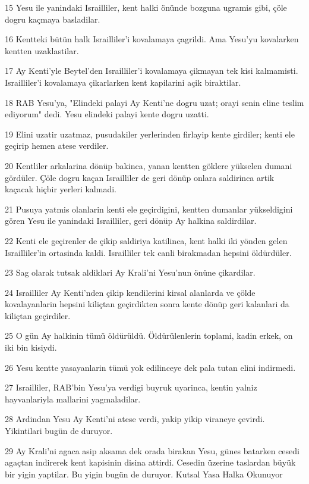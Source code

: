 \par 15 Yesu ile yanindaki Israilliler, kent halki önünde bozguna ugramis gibi, çöle dogru kaçmaya basladilar.
\par 16 Kentteki bütün halk Israilliler'i kovalamaya çagrildi. Ama Yesu'yu kovalarken kentten uzaklastilar.
\par 17 Ay Kenti'yle Beytel'den Israilliler'i kovalamaya çikmayan tek kisi kalmamisti. Israilliler'i kovalamaya çikarlarken kent kapilarini açik biraktilar.
\par 18 RAB Yesu'ya, "Elindeki palayi Ay Kenti'ne dogru uzat; orayi senin eline teslim ediyorum" dedi. Yesu elindeki palayi kente dogru uzatti.
\par 19 Elini uzatir uzatmaz, pusudakiler yerlerinden firlayip kente girdiler; kenti ele geçirip hemen atese verdiler.
\par 20 Kentliler arkalarina dönüp bakinca, yanan kentten göklere yükselen dumani gördüler. Çöle dogru kaçan Israilliler de geri dönüp onlara saldirinca artik kaçacak hiçbir yerleri kalmadi.
\par 21 Pusuya yatmis olanlarin kenti ele geçirdigini, kentten dumanlar yükseldigini gören Yesu ile yanindaki Israilliler, geri dönüp Ay halkina saldirdilar.
\par 22 Kenti ele geçirenler de çikip saldiriya katilinca, kent halki iki yönden gelen Israilliler'in ortasinda kaldi. Israilliler tek canli birakmadan hepsini öldürdüler.
\par 23 Sag olarak tutsak aldiklari Ay Krali'ni Yesu'nun önüne çikardilar.
\par 24 Israilliler Ay Kenti'nden çikip kendilerini kirsal alanlarda ve çölde kovalayanlarin hepsini kiliçtan geçirdikten sonra kente dönüp geri kalanlari da kiliçtan geçirdiler.
\par 25 O gün Ay halkinin tümü öldürüldü. Öldürülenlerin toplami, kadin erkek, on iki bin kisiydi.
\par 26 Yesu kentte yasayanlarin tümü yok edilinceye dek pala tutan elini indirmedi.
\par 27 Israilliler, RAB'bin Yesu'ya verdigi buyruk uyarinca, kentin yalniz hayvanlariyla mallarini yagmaladilar.
\par 28 Ardindan Yesu Ay Kenti'ni atese verdi, yakip yikip viraneye çevirdi. Yikintilari bugün de duruyor.
\par 29 Ay Krali'ni agaca asip aksama dek orada birakan Yesu, günes batarken cesedi agaçtan indirerek kent kapisinin disina attirdi. Cesedin üzerine taslardan büyük bir yigin yaptilar. Bu yigin bugün de duruyor. Kutsal Yasa Halka Okunuyor
